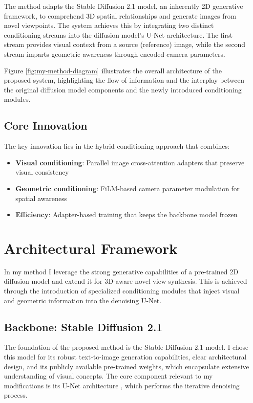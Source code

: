The method adapts the Stable Diffusion 2.1 model, an inherently 2D generative framework, to comprehend 3D spatial relationships and generate images from novel viewpoints. The system achieves this by integrating two distinct conditioning streams into the diffusion model's U-Net architecture. The first stream provides visual context from a source (reference) image, while the second stream imparts geometric awareness through encoded camera parameters.

Figure \ref{fig:my-method-diagram} illustrates the overall architecture of the proposed system, highlighting the flow of information and the interplay between the original diffusion model components and the newly introduced conditioning modules.

\subsection{Core Innovation}
The key innovation lies in the hybrid conditioning approach that combines:
\begin{itemize}
  \item \textbf{Visual conditioning}: Parallel image cross-attention adapters that preserve visual consistency
  \item \textbf{Geometric conditioning}: FiLM-based camera parameter modulation for spatial awareness
  \item \textbf{Efficiency}: Adapter-based training that keeps the backbone model frozen
\end{itemize}

\section{Architectural Framework}\label{sec:architectural-framework}
In my method I leverage the strong generative capabilities of a pre-trained 2D diffusion model and extend it for 3D-aware novel view synthesis. This is achieved through the introduction of specialized conditioning modules that inject visual and geometric information into the denoising U-Net.

\subsection{Backbone: Stable Diffusion 2.1}
The foundation of the proposed method is the Stable Diffusion 2.1 model. I chose this model for its robust text-to-image generation capabilities, clear architectural design, and its publicly available pre-trained weights, which encapsulate extensive understanding of visual concepts. The core component relevant to my modifications is its U-Net architecture \cite{unet}, which performs the iterative denoising process.


